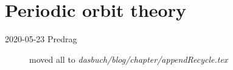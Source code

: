 
\chapter{Periodic orbit theory}
\label{chap:UPO}

\begin{description}
\item[2020-05-23 Predrag]
moved all to \emph{dasbuch/blog/chapter/appendRecycle.tex}

\end{description}
